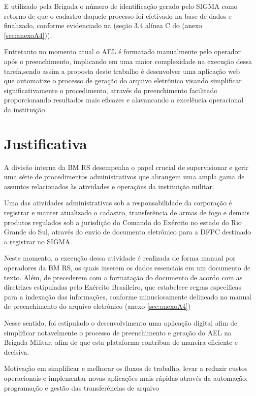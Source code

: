 E utilizado pela Brigada o número de identificação gerado pelo SIGMA como retorno de que o cadastro daquele processo foi efetivado na base de dados e finalizado, conforme evidenciado na (seção 3.4 alínea C do (anexo \ref{sec:anexoA4})).

Entretanto no momento atual o AEL é formatado manualmente pelo operador após o preenchimento, implicando em uma maior complexidade na execução dessa tarefa,sendo assim a proposta deste trabalho é desenvolver uma aplicação web que automatize o processo de geração do arquivo eletrônico visando simplificar significativamente o procedimento, através do preenchimento facilitado proporcionando resultados mais eficazes e alavancando a excelência operacional da instituição


\section{Justificativa}

A divisão interna da BM RS desempenha o papel crucial de supervisionar e gerir uma série de procedimentos administrativos que abrangem uma ampla gama de assuntos relacionados às atividades e operações da instituição militar. \cite{bmDepartamentoAdministrativo}

Uma das atividades administrativas sob a responsabilidade da corporação é registrar e manter atualizado o cadastro, transferência de armas de fogo e demais produtos regulados sob a jurisdição do Comando do Exército no estado do Rio Grande do Sul, através do envio de documento eletrônico para a DFPC destinado a registrar no SIGMA.\cite{ExércitoBrasileiro}

Neste momento, a execução dessa atividade é realizada de forma manual por operadores da BM RS, os quais inserem os dados essenciais em um documento de texto. Além, de precederem com a formatação do documento de acordo com as diretrizes estipuladas pelo Exército Brasileiro, que estabelece regras específicas para a indexação das informações, conforme minuciosamente delineado no manual de preenchimento do arquivo eletrônico (anexo \ref{sec:anexoA4})   

Nesse sentido, foi estipulado o desenvolvimento uma aplicação digital afim de simplificar notavelmente o processo de preenchimento e geração do AEL na Brigada Militar, afim de que esta plataforma contribua de maneira eficiente e decisiva.
\begin{citacao}
    Motivação em simplificar e melhorar os fluxos de trabalho, levar a reduzir custos operacionais e implementar novas aplicações mais rápidas através da automação, programação e gestão das transferências de arquivo\cite{AndradeJunior}
    \end{citacao}

